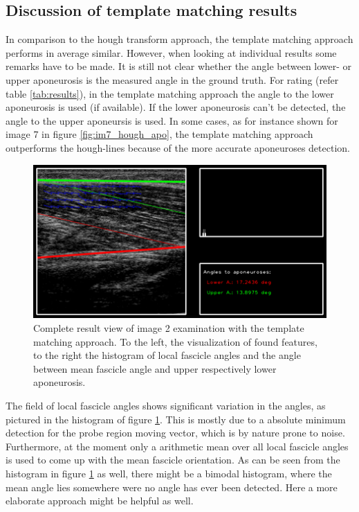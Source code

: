 \documentclass[10pt,twocolumn,letterpaper]{article}
\begin{document}
\subsection{Discussion of template matching results}
In comparison to the hough transform approach, the template matching approach performs in average similar. However, when looking at individual results some remarks have to be made. It is still not clear whether the angle between lower- or upper aponeurosis is the measured angle in the ground truth. For rating (refer table \ref{tab:results}), in the template matching approach the angle to the lower aponeurosis is used (if available). If the lower aponeurosis can't be detected, the angle to the upper aponeursis is used. In some cases, as for instance shown for image 7 in figure \ref{fig:im7_hough_apo}, the template matching approach outperforms the hough-lines because of the more accurate aponeuroses detection. 

\begin{figure}
	\begin{center}		
		\includegraphics[width=\linewidth]{img/im2_resView_tm}
		
	\end{center}
	\caption{Complete result view of image 2 examination with the template matching approach. To the left, the visualization of found features, to the right the histogram of local fascicle angles and the angle between mean fascicle angle and upper respectively lower aponeurosis.}
	\label{fig:im2_results}
\end{figure}

The field of local fascicle angles shows significant variation in the angles, as pictured in the histogram of figure \ref{fig:im2_results}. This is mostly due to a absolute minimum detection for the probe region moving vector, which is by nature prone to noise. Furthermore, at the moment only a arithmetic mean over all local fascicle angles is used to come up with the mean fascicle orientation. As can be seen from the histogram in figure \ref{fig:im2_results} as well, there might be a bimodal histogram, where the mean angle lies somewhere were no angle has ever been detected. Here a more elaborate approach might be helpful as well.
\end{document}
